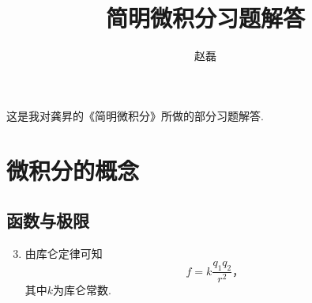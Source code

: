 \documentclass[a4paper,punct=CCT]{ctexbook}
\title{简明微积分习题解答}
\author{赵磊}
\begin{document}
\maketitle

这是我对龚昇的《简明微积分》所做的部分习题解答.

\chapter{微积分的概念}

\section{函数与极限}

\begin{enumerate}
  \setcounter{enumi}{2}
\item 由库仑定律可知
  \[
    f = k \frac{q_1 q_2}{r^2}\text{，}
  \]
  其中\(k\)为库仑常数.

\end{enumerate}
\end{document}
